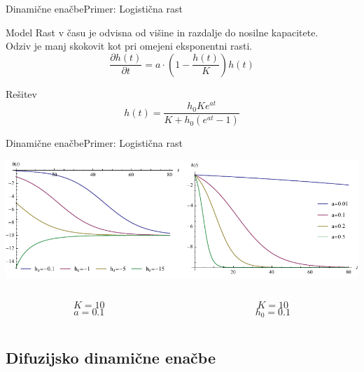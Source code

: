 \documentclass{beamer}
\begin{document}
\begin{frame}{Dinamične enačbe}{Primer: Logistična rast}
\begin{block}{Model}
  Rast v času je odvisna od višine in razdalje do nosilne kapacitete. \\
  Odziv je manj skokovit kot pri omejeni eksponentni rasti.
  \begin{equation} \frac{\partial h(t)}{\partial t} = a \cdot \left( 1 - \frac{h(t)}{K} \right) h(t) \end{equation}
\end{block}
\begin{block}{Rešitev}
  \begin{equation} h(t) = \frac{h_0 K e^{a t}}{K + h_0 (e^{a t}-1)} \end{equation}
\end{block}
\end{frame}

\begin{frame}{Dinamične enačbe}{Primer: Logistična rast}
\begin{center}
  \hspace*{-0.09\textwidth}\includegraphics[width=1.2\textwidth]{slike/logisticna-rast}
  \footnotesize
\begin{columns}
  \begin{column}{0.5\textwidth}
  \[ K = 10 \]
  \[ a = 0.1 \]
  \end{column}
  \begin{column}{0.5\textwidth}
  \[ K = 10 \]
  \[ h_0 = 0.1 \]
  \end{column}
\end{columns}
\end{center}
\end{frame}


\subsection{Difuzijsko dinamične enačbe}
\end{document}
